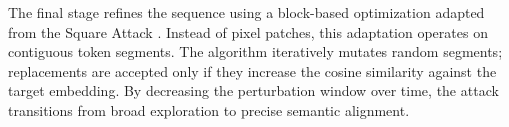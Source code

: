 \documentclass[a4paper, sigconf]{acmart}
\begin{document}
The final stage refines the sequence using a block-based optimization adapted from the Square Attack \cite{andriushchenko2020}. 
Instead of pixel patches, this adaptation operates on contiguous token segments. 
The algorithm iteratively mutates random segments; replacements are accepted only if they increase the cosine similarity against the target embedding. 
By decreasing the perturbation window over time, the attack transitions from broad exploration to precise semantic alignment.


%
%
%
%
%
%
%
%
%
%
%
\end{document}
